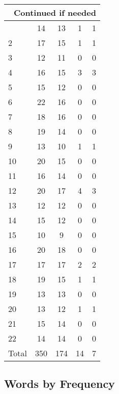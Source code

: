 \begin{center}
\begin{longtable}{l|c|c|c|c}
\hline \multicolumn{5}{|r|}{{Continued if needed}} \\ \hline
\endfoot 
1 & 14 & 13 & 1 & 1\\ \hline
2 & 17 & 15 & 1 & 1\\ \hline
3 & 12 & 11 & 0 & 0\\ \hline
4 & 16 & 15 & 3 & 3\\ \hline
5 & 15 & 12 & 0 & 0\\ \hline
6 & 22 & 16 & 0 & 0\\ \hline
7 & 18 & 16 & 0 & 0\\ \hline
8 & 19 & 14 & 0 & 0\\ \hline
9 & 13 & 10 & 1 & 1\\ \hline
10 & 20 & 15 & 0 & 0\\ \hline
11 & 16 & 14 & 0 & 0\\ \hline
12 & 20 & 17 & 4 & 3\\ \hline
13 & 12 & 12 & 0 & 0\\ \hline
14 & 15 & 12 & 0 & 0\\ \hline
15 & 10 & 9 & 0 & 0\\ \hline
16 & 20 & 18 & 0 & 0\\ \hline
17 & 17 & 17 & 2 & 2\\ \hline
18 & 19 & 15 & 1 & 1\\ \hline
19 & 13 & 13 & 0 & 0\\ \hline
20 & 13 & 12 & 1 & 1\\ \hline
21 & 15 & 14 & 0 & 0\\ \hline
22 & 14 & 14 & 0 & 0\\ \hline
\hline \hline
Total & 350 & 174 & 14 & 7



\end{longtable}
\end{center}

 
\subsection{Words by Frequency}


